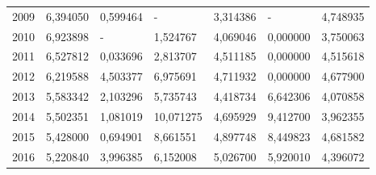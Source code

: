\begin{table}
\begin{tabular}{p{1cm}p{2cm}p{2cm}p{2cm}p{2cm}p{2cm}p{2cm}}
 2009 &          6,394050 &                         0,599464 &                                   - &               3,314386 &                        - &                                4,748935 \\
 2010 &          6,923898 &                                - &                            1,524767 &               4,069046 &                 0,000000 &                                3,750063 \\
 2011 &          6,527812 &                         0,033696 &                            2,813707 &               4,511185 &                 0,000000 &                                4,515618 \\
 2012 &          6,219588 &                         4,503377 &                            6,975691 &               4,711932 &                 0,000000 &                                4,677900 \\
 2013 &          5,583342 &                         2,103296 &                            5,735743 &               4,418734 &                 6,642306 &                                4,070858 \\
 2014 &          5,502351 &                         1,081019 &                           10,071275 &               4,695929 &                 9,412700 &                                3,962355 \\
 2015 &          5,428000 &                         0,694901 &                            8,661551 &               4,897748 &                 8,449823 &                                4,681582 \\
 2016 &          5,220840 &                         3,996385 &                            6,152008 &               5,026700 &                 5,920010 &                                4,396072 \\
\bottomrule
\end{tabular}
\end{table}
